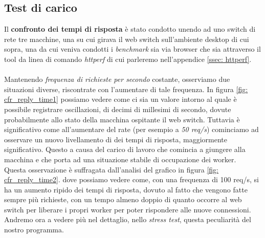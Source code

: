 \documentclass[italian]{tktltiki2}
\begin{document}
\subsection{Test di carico}
Il \textbf{confronto dei tempi di risposta} è stato condotto unendo ad uno switch di rete tre macchine, una su cui girava il web switch sull'ambiente desktop di cui sopra, una da cui veniva condotti i \emph{benchmark} sia via browser che sia attraverso il tool da linea di comando \emph{httperf} di cui parleremo nell'appendice \ref{ssec: httperf}. \\\\
Mantenendo \emph{frequenza di richieste per secondo} costante, osserviamo due situazioni diverse, riscontrate con l'aumentare di tale frequenza. In figura \ref{fig: cfr_reply_time1} possiamo vedere come ci sia un valore intorno al quale è possibile registrare oscillazioni, di decimi di millesimi di secondo, dovute probabilmente allo stato della macchina ospitante il web switch. Tuttavia è significativo come all'aumentare del rate (per esempio a \emph{50 req/s}) cominciamo ad osservare un nuovo livellamento di dei tempi di risposta, maggiormente significativo. Questo a causa del carico di lavoro che comincia a giungere alla macchina e che porta ad una situazione stabile di occupazione dei worker. \\ 
Questa osservazione è suffragata dall'analisi del grafico in figura \ref{fig: cfr_reply_time2}. dove possiamo vedere come, con una frequenza di 100 req/s, si ha un aumento ripido dei tempi di risposta, dovuto al fatto che vengono fatte sempre più richieste, con un tempo almeno doppio di quanto occorre al web switch per liberare i propri worker per poter rispondere alle nuove connessioni. Andremo ora a vedere più nel dettaglio, nello \emph{stress test}, questa peculiarità del nostro programma.
\end{document}
